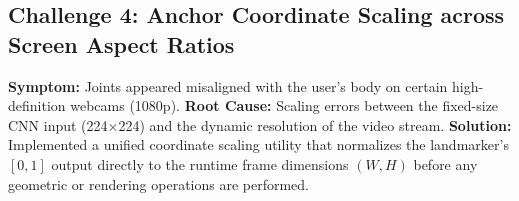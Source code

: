\subsection{Challenge 4: Anchor Coordinate Scaling across Screen Aspect Ratios}
\textbf{Symptom:} Joints appeared misaligned with the user's body on certain high-definition webcams (1080p).
\textbf{Root Cause:} Scaling errors between the fixed-size CNN input (224$\times$224) and the dynamic resolution of the video stream.
\textbf{Solution:} Implemented a unified coordinate scaling utility that normalizes the landmarker's $[0,1]$ output directly to the runtime frame dimensions $(W, H)$ before any geometric or rendering operations are performed.
